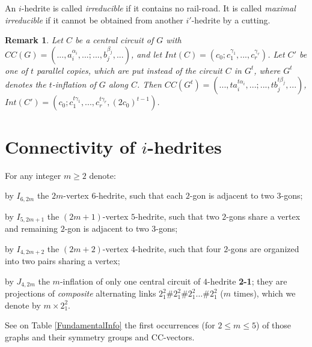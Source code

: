 \documentclass[12pt]{article}
\newtheorem{remark}{Remark}
\begin{document}

An $i$-hedrite is called {\em irreducible} if it contains no 
rail-road. It is called {\em maximal irreducible} if it cannot be
obtained from another $i'$-hedrite by a cutting.


\begin{remark}

Let $C$ be a central circuit of $G$ with $CC(G)=(...,a_i^{\alpha_i},...;...,b_j^{\beta_j},...)$,  and let 
$Int(C)=(c_0;c_1^{\gamma_1},...,c_r^{\gamma_r})$. Let $C'$ be one of 
$t$ parallel copies, which are put instead of the circuit $C$ in 
$G^t$, where $G^t$ denotes the $t$-inflation of $G$ along $C$.
Then $CC(G^t)=(...,ta_i^{t\alpha_i},...;...,tb_j^{t\beta_j},...)$,
$Int(C')=(c_0;c_1^{t\gamma_1},...,c_r^{t\gamma_r}, (2c_0)^{t-1})$.
\end{remark}


\section{Connectivity of $i$-hedrites}
For any integer $m\geq 2$ denote:

by $I_{6,2m}$ the $2m$-vertex $6$-hedrite, such that each $2$-gon is adjacent to two $3$-gons;

by $I_{5,2m+1}$ the $(2m+1)$-vertex $5$-hedrite, such that 
two $2$-gons share a vertex and remaining $2$-gon is adjacent
to two $3$-gons;

by $I_{4,2m+2}$ the $(2m+2)$-vertex $4$-hedrite, such that 
four $2$-gons are organized into two pairs sharing a vertex; 

by $J_{4,2m}$ the $m$-inflation of only one central circuit of
$4$-hedrite {\bf 2-1}; they are projections of {\em composite}
alternating links $2^2_1\#2^2_1\#2^2_1\dots\#2^2_1$ ($m$ times),
which we denote by $m\times 2^2_1$.

See on Table \ref{FundamentalInfo} the first occurrences 
(for $2\leq m\leq 5$) of those graphs and their symmetry 
groups and CC-vectors.
\end{document}
